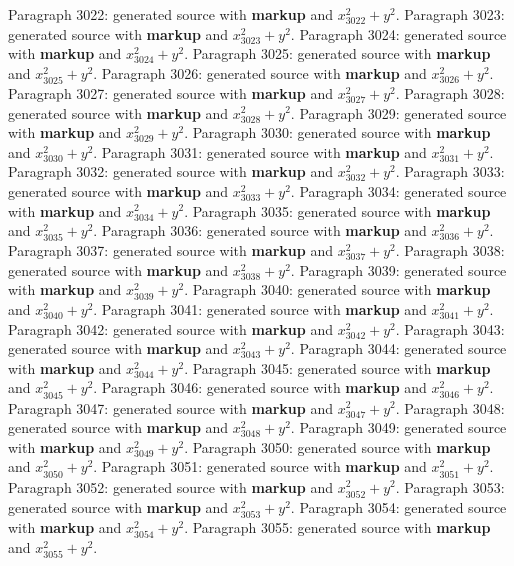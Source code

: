 \documentclass{article}
\begin{document}
Paragraph 3022: generated source with \textbf{markup} and $x_{3022}^2 + y^2$.
Paragraph 3023: generated source with \textbf{markup} and $x_{3023}^2 + y^2$.
Paragraph 3024: generated source with \textbf{markup} and $x_{3024}^2 + y^2$.
Paragraph 3025: generated source with \textbf{markup} and $x_{3025}^2 + y^2$.
Paragraph 3026: generated source with \textbf{markup} and $x_{3026}^2 + y^2$.
Paragraph 3027: generated source with \textbf{markup} and $x_{3027}^2 + y^2$.
Paragraph 3028: generated source with \textbf{markup} and $x_{3028}^2 + y^2$.
Paragraph 3029: generated source with \textbf{markup} and $x_{3029}^2 + y^2$.
Paragraph 3030: generated source with \textbf{markup} and $x_{3030}^2 + y^2$.
Paragraph 3031: generated source with \textbf{markup} and $x_{3031}^2 + y^2$.
Paragraph 3032: generated source with \textbf{markup} and $x_{3032}^2 + y^2$.
Paragraph 3033: generated source with \textbf{markup} and $x_{3033}^2 + y^2$.
Paragraph 3034: generated source with \textbf{markup} and $x_{3034}^2 + y^2$.
Paragraph 3035: generated source with \textbf{markup} and $x_{3035}^2 + y^2$.
Paragraph 3036: generated source with \textbf{markup} and $x_{3036}^2 + y^2$.
Paragraph 3037: generated source with \textbf{markup} and $x_{3037}^2 + y^2$.
Paragraph 3038: generated source with \textbf{markup} and $x_{3038}^2 + y^2$.
Paragraph 3039: generated source with \textbf{markup} and $x_{3039}^2 + y^2$.
Paragraph 3040: generated source with \textbf{markup} and $x_{3040}^2 + y^2$.
Paragraph 3041: generated source with \textbf{markup} and $x_{3041}^2 + y^2$.
Paragraph 3042: generated source with \textbf{markup} and $x_{3042}^2 + y^2$.
Paragraph 3043: generated source with \textbf{markup} and $x_{3043}^2 + y^2$.
Paragraph 3044: generated source with \textbf{markup} and $x_{3044}^2 + y^2$.
Paragraph 3045: generated source with \textbf{markup} and $x_{3045}^2 + y^2$.
Paragraph 3046: generated source with \textbf{markup} and $x_{3046}^2 + y^2$.
Paragraph 3047: generated source with \textbf{markup} and $x_{3047}^2 + y^2$.
Paragraph 3048: generated source with \textbf{markup} and $x_{3048}^2 + y^2$.
Paragraph 3049: generated source with \textbf{markup} and $x_{3049}^2 + y^2$.
Paragraph 3050: generated source with \textbf{markup} and $x_{3050}^2 + y^2$.
Paragraph 3051: generated source with \textbf{markup} and $x_{3051}^2 + y^2$.
Paragraph 3052: generated source with \textbf{markup} and $x_{3052}^2 + y^2$.
Paragraph 3053: generated source with \textbf{markup} and $x_{3053}^2 + y^2$.
Paragraph 3054: generated source with \textbf{markup} and $x_{3054}^2 + y^2$.
Paragraph 3055: generated source with \textbf{markup} and $x_{3055}^2 + y^2$.
\end{document}
